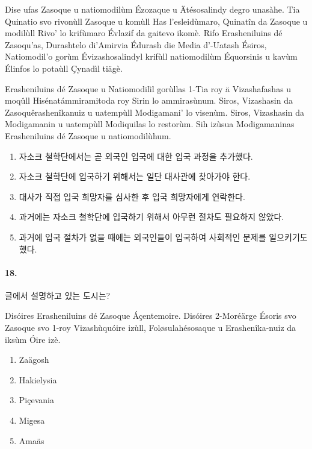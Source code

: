 \documentclass{article}
\begin{document}
\begin{reminder}
    Dise ufas Zasoque u natiomodilùm Ézozaque u Ätésosalindy degro unasàhe. Tia Quinatio svo rivonùll Zasoque u komùll Has l'esleidùmaro, Quinatîn da Zasoque u modilùll Rivo' lo krifùmaro Évlazif da gaitevo ikomè. Rifo Erasheniluins dé Zasoqu'as, Durashtelo di'Amirvia Édurash die Media d'-Uatash Ésiros, Natiomodil'o gorùm Évizashosalindyl krifùll natiomodilùm Équorsinis u kavùm Élinfos lo potaùll Çynadìl tiägè.

    Erasheniluins dé Zasoque u Natiomodilìl gorùllas 1-Tia roy ä Vizashafashas u moqûll Hisénatámmiramitoda roy Sirin lo ammirasùnum. Siros, Vizashasin da Zasoquêrashenîkanuiz u uatempùll Modigamani' lo visenùm. Siros, Vizashasin da Modigamanin u uatempùll Modiquilas lo restorùm. Sih izùsua Modigamaninas Erasheniluins dé Zasoque u natiomodilùhum.
\end{reminder}

\begin{enumerate}
    \item 자소크 철학단에서는 곧 외국인 입국에 대한 입국 과정을 추가했다.
    \item 자소크 철학단에 입국하기 위해서는 일단 대사관에 찾아가야 한다.
    \item 대사가 직접 입국 희망자를 심사한 후 입국 희망자에게 연락한다.
    \item 과거에는 자소크 철학단에 입국하기 위해서 아무런 절차도 필요하지 않았다.
    \item 과거에 입국 절차가 없을 때에는 외국인들이 입국하여 사회적인 문제를 일으키기도 했다.
\end{enumerate}

\paragraph{18.}
글에서 설명하고 있는 도시는?

\begin{reminder}
    Disóires Erasheniluins dé Zasoque Áçentemoire.
    Disóires 2-Moréärge Ésoris svo Zasoque svo 1-roy Vizashùquóire izùll,
    Foløsulahésosaque u Erashenîka-nuiz da iksùm Óire izè.
\end{reminder}

\begin{enumerate}
    \item Zaägosh
    \item Hakielysia
    \item Piçevania
    \item Migesa
    \item Amaäs
\end{enumerate}
\end{document}
